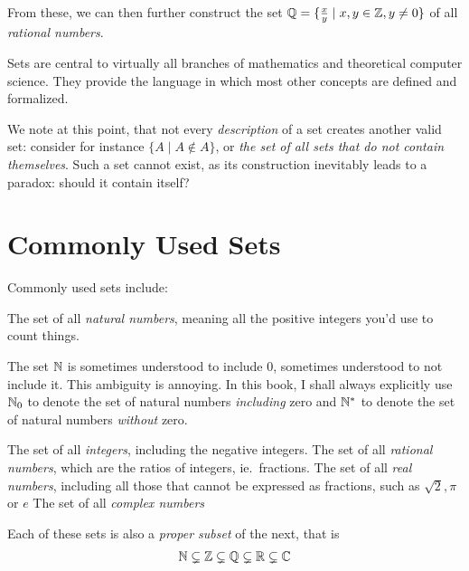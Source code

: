 From these, we can then further construct the set
\(\mathbb{Q} = \{\frac{x}{y} \mid x,y \in \mathbb{Z}, y \neq 0\}\) of all
\emph{rational numbers}.

Sets are central to virtually all branches of mathematics and theoretical
computer science. They provide the language in which most other concepts are
defined and formalized.

We note at this point, that not every \emph{description} of a set creates
another valid set: consider for instance \(\{A \mid A \notin A\}\), or \emph{the
set of all sets that do not contain themselves}. Such a set cannot exist, as its
construction inevitably leads to a paradox: should it contain itself?

\section{Commonly Used Sets}
Commonly used sets include:
\begin{itemize}
  \ii{\(\NN\):} The set of all \emph{natural numbers}, meaning all the positive integers
        you'd use to count things.
\begin{remark}
  The set \(\NN\) is sometimes understood to include \(0\), sometimes understood
  to not include it. This ambiguity is annoying.
  In this book, I shall always explicitly use \(\mathbb{N}_{0}\) to denote the set of
  natural numbers \emph{including} zero and \(\mathbb{N}^{*}\) to denote the set of
  natural numbers \emph{without} zero.
\end{remark}
  \ii{\(\ZZ\):} The set of all \emph{integers}, including the negative integers.
  \ii{\(\QQ\)} The set of all \emph{rational numbers}, which are the ratios of integers,
        ie.\ fractions.
  \ii{\(\RR\):} The set of all \emph{real numbers}, including all those that cannot be
        expressed as fractions, such as \(\sqrt{2}, \pi\) or \(e\)
  \ii{\(\CC\)} The set of all \emph{complex numbers}
\end{itemize}

Each of these sets is also a \emph{proper subset} of the next, that is
\begin{align*}
  \mathbb{N} \subsetneq \mathbb{Z} \subsetneq \mathbb{Q} \subsetneq \mathbb{R} \subsetneq \mathbb{C}
\end{align*}

